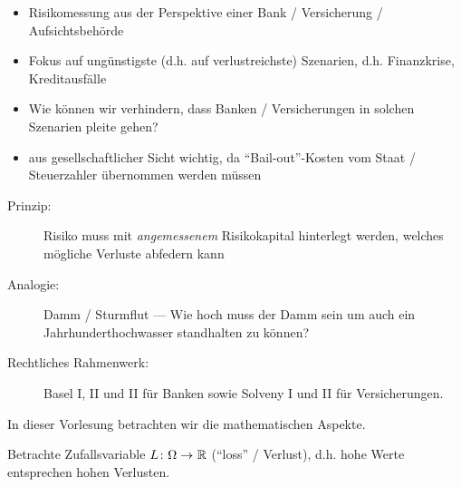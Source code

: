 \begin{itemize}[nolistsep, leftmargin=*]
	\item Risikomessung aus der Perspektive einer Bank / Versicherung / Aufsichtsbehörde
	\item Fokus auf ungünstigste (d.h. auf verlustreichste) Szenarien, d.h. Finanzkrise, Kreditausfälle
	\item Wie können wir verhindern, dass Banken / Versicherungen in solchen Szenarien pleite gehen?
	\item aus gesellschaftlicher Sicht wichtig, da \enquote{Bail-out}-Kosten vom Staat / Steuerzahler übernommen werden müssen
\end{itemize}

\begin{description}
	\item[Prinzip:] Risiko muss mit \textit{angemessenem} Risikokapital hinterlegt werden, welches mögliche Verluste abfedern kann
	\item[Analogie:] Damm / Sturmflut --- Wie hoch muss der Damm sein um auch ein Jahrhunderthochwasser standhalten zu können?
	\item[Rechtliches Rahmenwerk:] Basel I, II und II für Banken sowie Solveny I und II für Versicherungen.
\end{description}



In dieser Vorlesung betrachten wir die mathematischen Aspekte.

Betrachte Zufallsvariable $\abb{L}{\Omega}{\R}$ (\enquote{loss} / Verlust), d.h. hohe Werte entsprechen hohen Verlusten.